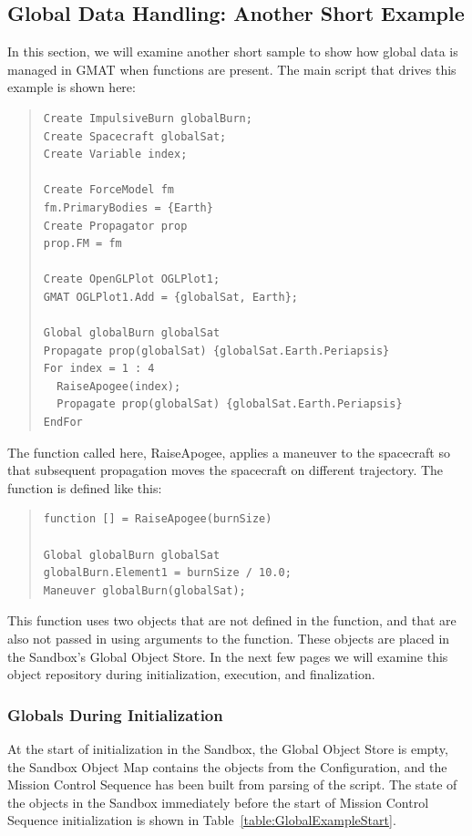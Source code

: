 \subsection{Global Data Handling: Another Short Example}
In this section, we will examine another short sample to show how global data is managed in GMAT
when functions are present.  The main script that drives this example is shown here:

\begin{quote}
\begin{verbatim}
Create ImpulsiveBurn globalBurn;
Create Spacecraft globalSat;
Create Variable index;

Create ForceModel fm
fm.PrimaryBodies = {Earth}
Create Propagator prop
prop.FM = fm

Create OpenGLPlot OGLPlot1;
GMAT OGLPlot1.Add = {globalSat, Earth};

Global globalBurn globalSat
Propagate prop(globalSat) {globalSat.Earth.Periapsis}
For index = 1 : 4
  RaiseApogee(index);
  Propagate prop(globalSat) {globalSat.Earth.Periapsis}
EndFor
\end{verbatim} 
\end{quote} 

The function called here, RaiseApogee, applies a maneuver to the spacecraft so that subsequent
propagation moves the spacecraft on different trajectory.  The function is defined like this:

\begin{quote}
\begin{verbatim}
function [] = RaiseApogee(burnSize)

Global globalBurn globalSat
globalBurn.Element1 = burnSize / 10.0;
Maneuver globalBurn(globalSat);
\end{verbatim}
\end{quote}

This function uses two objects that are not defined in the function, and that are also not passed in
using arguments to the function.  These objects are placed in the Sandbox's Global Object Store.  In
the next few pages we will examine this object repository during initialization, execution, and
finalization.

\subsubsection{Globals During Initialization}

At the start of initialization in the Sandbox, the Global Object Store is empty, the Sandbox Object
Map contains the objects from the Configuration, and the Mission Control Sequence has been built
from parsing of the script.  The state of the objects in the Sandbox immediately before the start of
Mission Control Sequence initialization is shown in Table~\ref{table:GlobalExampleStart}.

